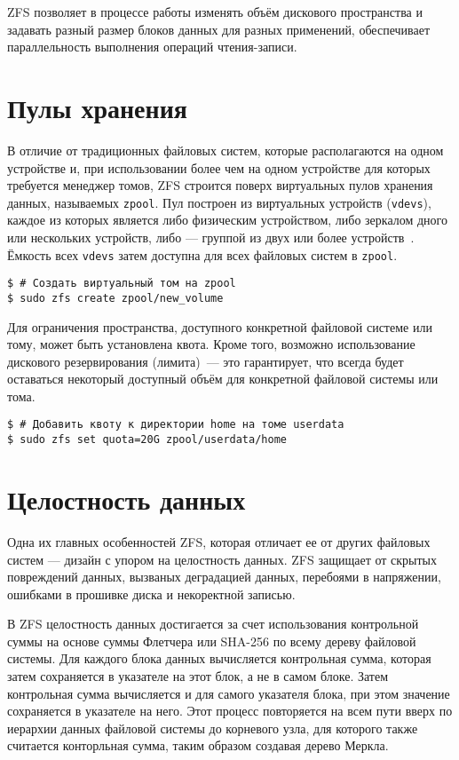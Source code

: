 \documentclass[a4page]{article}
\begin{document}
ZFS позволяет в процессе работы изменять объём дискового пространства
и задавать разный размер блоков данных для разных применений,
обеспечивает параллельность выполнения операций чтения-записи.

\section{Пулы хранения}

В отличие от традиционных файловых систем, которые располагаются на одном устройстве и,
при использовании более чем на одном устройстве для которых требуется менеджер томов,
ZFS строится поверх виртуальных пулов хранения данных, называемых \texttt{zpool}.
Пул построен из виртуальных устройств (\texttt{vdevs}),
каждое из которых является либо физическим устройством,
либо зеркалом дного или нескольких устройств,
либо --- группой из двух или более устройств~\cite{arch}.
Ёмкость всех \texttt{vdevs} затем доступна для всех файловых систем в \texttt{zpool}.

\begin{verbatim}
$ # Создать виртуальный том на zpool
$ sudo zfs create zpool/new_volume
\end{verbatim}

Для ограничения пространства, доступного конкретной файловой системе или тому, может быть установлена квота.
Кроме того, возможно использование дискового резервирования (лимита) --- это гарантирует,
что всегда будет оставаться некоторый доступный объём для конкретной файловой системы или тома.

\begin{verbatim}
$ # Добавить квоту к директории home на томе userdata
$ sudo zfs set quota=20G zpool/userdata/home
\end{verbatim}

\section{Целостность данных}

Одна их главных особенностей ZFS, которая отличает ее от других файловых систем --- дизайн с упором на целостность данных.
ZFS защищает от скрытых повреждений данных, вызваных деградацией данных, перебоями в напряжении, ошибками в прошивке диска и некоректной записью.

В ZFS целостность данных достигается за счет использования контрольной суммы
на основе суммы Флетчера или SHA-256 по всему дереву файловой системы.
Для каждого блока данных вычисляется контрольная сумма,
которая затем сохраняется в указателе на этот блок, а не в самом блоке.
Затем контрольная сумма вычисляется и для самого указателя блока,
при этом значение сохраняется в указателе на него.
Этот процесс повторяется на всем пути вверх по иерархии данных файловой системы до корневого узла,
для которого также считается конторльная сумма, таким образом создавая дерево Меркла.
\end{document}
